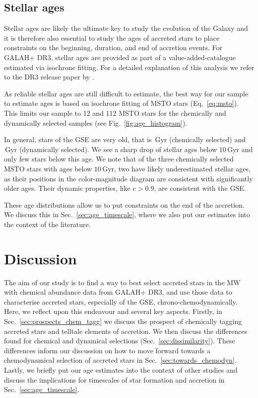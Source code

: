 \documentclass[fleqn,usenatbib]{mnras}
\newcommand{\Gyr}{\,\mathrm{Gyr}}	%
\begin{document}
\subsection{Stellar ages} \label{sec:gse_stellar_ages}

Stellar ages are likely the ultimate key to study the evolution of the Galaxy and it is therefore also essential to study the ages of accreted stars to place constraints on the beginning, duration, and end of accretion events. For GALAH+ DR3, stellar ages are provided as part of a value-added-catalogue estimated via isochrone fitting. For a detailed explanation of this analysis we refer to the DR3 release paper by \citet{Buder2021}.

As reliable stellar ages are still difficult to estimate, the best way for our sample to estimate ages is based on isochrone fitting of MSTO stars (Eq.~\ref{eq:msto}). This limits our sample to 12 and 112 MSTO stars for the chemically and dynamically selected samples (see Fig.~\ref{fig:age_histogram}). 

In general, stars of the GSE are very old, that is $\Gyr$ (chemically selected) and $\Gyr$ (dynamically selected). We see a sharp drop of stellar ages below $10\Gyr$ and only few stars below this age. We note that of the three chemically selected MSTO stars with ages below $10\Gyr$, two have likely underestimated stellar ages, as their positions in the color-magnitude diagram are consistent with significantly older ages. Their dynamic properties, like $e > 0.9$, are consistent with the GSE.

These age distributions allow us to put constraints on the end of the accretion. We discuss this in Sec.~\ref{sec:age_timescale}, where we also put our estimates into the context of the literature. 

\section{Discussion} \label{sec:discussion}

The aim of our study is to find a way to best select accreted stars in the MW with chemical abundance data from GALAH+ DR3, and use those data to characterise accreted stars, especially of the GSE, chrono-chemodynamically. Here, we reflect upon this endeavour and several key aspects. Firstly, in Sec.~\ref{sec:prospects_chem_tagg} we discuss the prospect of chemically tagging accreted stars and telltale elements of accretion. We then discuss the differences found for chemical and dynamical selections (Sec.~\ref{sec:dissimilarity}). These differences inform our discussion on how to move forward towards a chemodynamical selection of accreted stars in Sec.~\ref{sec:towards_chemodyn}. Lastly, we briefly put our age estimates into the context of other studies and discuss the implications for timescales of star formation and accretion in Sec.~\ref{sec:age_timescale}.
\end{document}
